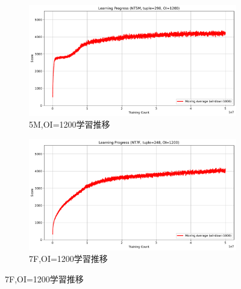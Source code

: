 \begin{figure}[t]
    \vspace{1em}
    \begin{subfigure}[b]{0.49\linewidth}
        \includegraphics[width=\linewidth]{pdf/learning_progress_plots/learning_progress_NT5_tuple298_OI1200.pdf}
        \caption{5M,OI=1200学習推移}
        \label{fig:NT5M_OI1200_learning_progress}
    \end{subfigure}
    \begin{subfigure}[b]{0.49\linewidth}
        \includegraphics[width=\linewidth]{pdf/learning_progress_plots/learning_progress_NT7_tuple248_OI1200.pdf}
        \caption{7F,OI=1200学習推移}
        \label{fig:NT7F_OI1200_learning_progress}
    \end{subfigure}


\end{figure}
